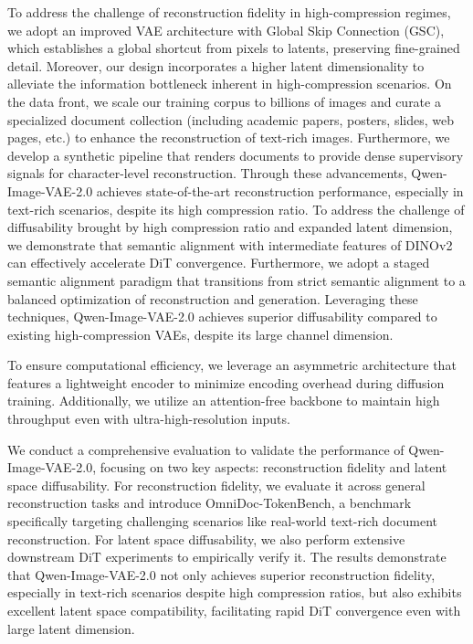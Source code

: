 To address the challenge of reconstruction fidelity in high-compression regimes, we adopt an improved VAE architecture with Global Skip Connection (GSC), which establishes a global shortcut from pixels to latents, preserving fine-grained detail. Moreover, our design incorporates a higher latent dimensionality to alleviate the information bottleneck inherent in high-compression scenarios. On the data front, we scale our training corpus to billions of images and curate a specialized document collection (including academic papers, posters, slides, web pages, etc.) to enhance the reconstruction of text-rich images. Furthermore, we develop a synthetic pipeline that renders documents to provide dense supervisory signals for character-level reconstruction. Through these advancements, Qwen-Image-VAE-2.0 achieves state-of-the-art reconstruction performance, especially in text-rich scenarios, despite its high compression ratio.
To address the challenge of diffusability brought by high compression ratio and expanded latent dimension, we demonstrate that semantic alignment with intermediate features of DINOv2~\citep{dinov2} can effectively accelerate DiT convergence. Furthermore, we adopt a staged semantic alignment paradigm that transitions from strict semantic alignment to a balanced optimization of reconstruction and generation. Leveraging these techniques, Qwen-Image-VAE-2.0 achieves superior diffusability compared to existing high-compression VAEs, despite its large channel dimension.

To ensure computational efficiency, we leverage an asymmetric architecture that features a lightweight encoder to minimize encoding overhead during diffusion training. Additionally, we utilize an attention-free backbone to maintain high throughput even with ultra-high-resolution inputs. 

We conduct a comprehensive evaluation to validate the performance of Qwen-Image-VAE-2.0, focusing on two key aspects: reconstruction fidelity and latent space diffusability. For reconstruction fidelity, we evaluate it across general reconstruction tasks and introduce OmniDoc-TokenBench, a benchmark specifically targeting challenging scenarios like real-world text-rich document reconstruction. For latent space diffusability, we also perform extensive downstream DiT experiments to empirically verify it. The results demonstrate that Qwen-Image-VAE-2.0 not only achieves superior reconstruction fidelity, especially in text-rich scenarios despite high compression ratios, but also exhibits excellent latent space compatibility, facilitating rapid DiT convergence even with large latent dimension.

